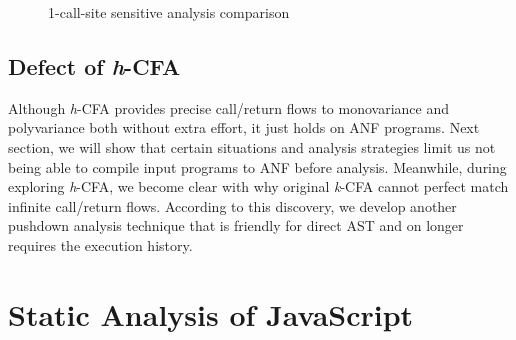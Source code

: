 \documentclass{article}
\begin{document}
\begin{figure}[h]
  \small
  \centering
{}
\caption{1-call-site sensitive analysis comparison}
\label{1-benchmark}
\end{figure}

\subsection{Defect of \textit{h}-CFA}
\label{sub:Defect of h-CFA}
Although \textit{h}-CFA provides precise call/return flows to monovariance and polyvariance both without extra effort, it just holds on ANF programs. Next section, we will show that certain situations and analysis strategies limit us not being able to compile input programs to ANF before analysis.
Meanwhile, during exploring \textit{h}-CFA, we become clear with why original \textit{k}-CFA cannot perfect match infinite call/return flows. According to this discovery, we develop another pushdown analysis technique that is friendly for direct AST and on longer requires the execution history.

\section{Static Analysis of JavaScript}
\label{sec:Static Analysis of JavaScript}
\end{document}
